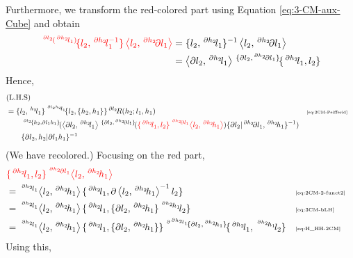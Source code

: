 \documentclass[11pt, reqno]{amsart} %
\newcommand{\act}[1]{\,\sp{#1}\!}
\newcommand{\red}[1]{\textcolor{red}{#1}}
\theoremstyle{definition}
\theoremstyle{remark}
\numberwithin{equation}{section}
\begin{document}
Furthermore, we transform the red-colored part using Equation \eqref{eq:3-CM-aux-Cube} 
and obtain
\begin{align*}
  \red{\act{\act{\partial l_2}(\act{\partial h_2}l_1)}\{l_2,\act{\partial h_2}l_1^{-1}\}\left<l_2,\act{\partial h_2}\partial l_1\right>} &= \{l_2,\act{\partial h_2}l_1\}^{-1}\left<l_2,\act{\partial h_2}\partial l_1\right> \\
  &= \left<\partial l_2,\act{\partial h_2}l_1\right>\act{\{\partial l_2,\act{\partial h_2}\partial l_1\}}\{\act{\partial h_2}l_1,l_2\}
\end{align*}
Hence,
\begin{align*}
  &(\text{L.H.S}) \\
  &= \{l_2,\act{h_2}l_1\}\act{\act{\partial l_2h_2}l_1}\{l_2,\{h_2,h_1\}\}\act{\partial l_2}R(h_2;l_1,h_1) & &\text{\tiny \eqref{eq:2CM-Peifferid}} \\
  &\qquad \act{\act{\partial l_2}\{h_2,\partial l_1h_1\}}(\left<\partial l_2,\act{\partial h_2}l_1\right>\act{\{\partial l_2,\act{\partial h_2}\partial l_1\}}(\red{\{\act{\partial h_2}l_1,l_2\}\act{\act{\partial h_2}\partial l_1}\left<l_2,\act{\partial h_2}h_1\right>})\{\partial l_2|\act{\partial h_2}\partial l_1,\act{\partial h_2}h_1\}^{-1}) \\
  &\qquad \{\partial l_2,h_2|\partial l_1h_1\}^{-1}
\end{align*}
(We have recolored.) Focusing on the red part,
\begin{align*}
  &\red{\{\act{\partial h_2}l_1,l_2\}\act{\act{\partial h_2}\partial l_1}\left<l_2,\act{\partial h_2}h_1\right>} \\
  &= \act{\act{\partial h_2}l_1}\left<l_2,\act{\partial h_2}h_1\right>\{\act{\partial h_2}l_1,\partial \left<l_2,\act{\partial h_2}h_1\right>^{-1}l_2\} & &\text{\tiny \eqref{eq:2CM-2-funct2}} \\
  &= \act{\act{\partial h_2}l_1}\left<l_2,\act{\partial h_2}h_1\right>\{\act{\partial h_2}l_1,\{\partial l_2,\act{\partial h_2}h_1\}\act{\act{\partial h_2}h_1}l_2\} & &\text{\tiny \eqref{eq:3CM-bLH}} \\
  &= \act{\act{\partial h_2}l_1}\left<l_2,\act{\partial h_2}h_1\right>\{\act{\partial h_2}l_1,\{\partial l_2,\act{\partial h_2}h_1\}\}\act{\act{\partial \act{\partial h_2}l_1}\{\partial l_2,\act{\partial h_2}h_1\}}\{\act{\partial h_2}l_1,\act{\act{\partial h_2}h_1}l_2\} & &\text{\tiny \eqref{eq:H_HH-2CM}}
\end{align*}
Using this,
\end{document}
